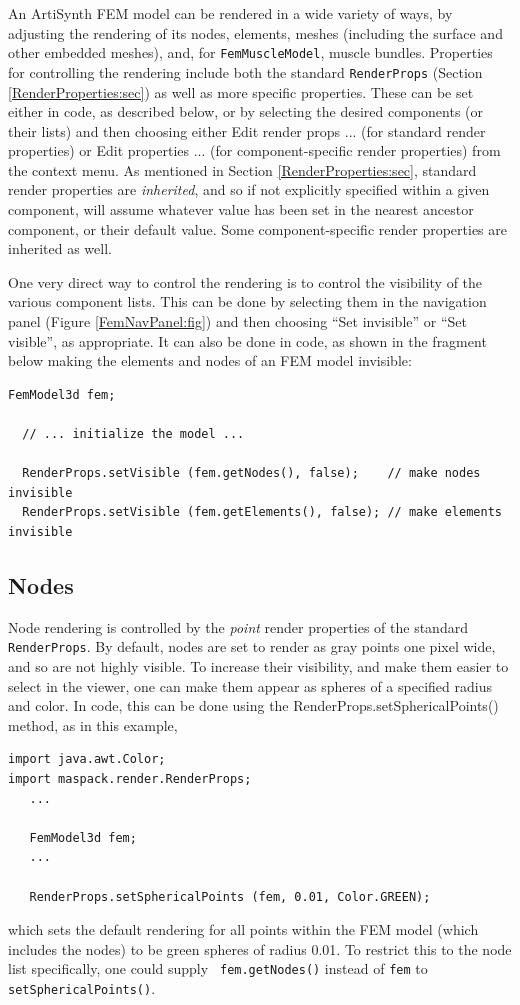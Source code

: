 An ArtiSynth FEM model can be rendered in a wide variety of ways, by
adjusting the rendering of its nodes, elements, meshes (including the
surface and other embedded meshes), and, for {\tt FemMuscleModel},
muscle bundles. Properties for controlling the rendering include both
the standard {\tt RenderProps} (Section \ref{RenderProperties:sec}) as
well as more specific properties. These can be set either in code, as
described below, or by selecting the desired components (or their
lists) and then choosing either {\sf Edit render props ...} (for
standard render properties) or {\sf Edit properties ...} (for
component-specific render properties) from the context menu. As
mentioned in Section \ref{RenderProperties:sec}, standard render
properties are {\it inherited}, and so if not explicitly specified
within a given component, will assume whatever value has been set in
the nearest ancestor component, or their default value.  Some
component-specific render properties are inherited as well.

One very direct way to control the rendering is to control the
visibility of the various component lists. This can be done by
selecting them in the navigation panel (Figure \ref{FemNavPanel:fig})
and then choosing {\sf ``Set invisible''} or {\sf ``Set visible''}, as
appropriate. It can also be done in code, as shown in the fragment
below making the elements and nodes of an FEM model invisible:
%
\begin{lstlisting}[]
  FemModel3d fem;     

  // ... initialize the model ...

  RenderProps.setVisible (fem.getNodes(), false);    // make nodes invisible
  RenderProps.setVisible (fem.getElements(), false); // make elements invisible
\end{lstlisting}
%

\subsection{Nodes}

Node rendering is controlled by the {\it point} render properties of
the standard {\tt RenderProps}. By default, nodes are set to render as
gray points one pixel wide, and so are not highly visible. To increase
their visibility, and make them easier to select in the viewer, one
can make them appear as spheres of a specified radius and color.  In
code, this can be done using the
%
{RenderProps.setSphericalPoints()} method, as in this example,
%
\begin{lstlisting}[]
import java.awt.Color;
import maspack.render.RenderProps;
   ...

   FemModel3d fem;
   ...

   RenderProps.setSphericalPoints (fem, 0.01, Color.GREEN);
\end{lstlisting}
%
which sets the default rendering for all points within the FEM model
(which includes the nodes) to be green spheres of radius 0.01. To restrict
this to the node list specifically, one could supply {\tt
fem.getNodes()} instead of {\tt fem} to {\tt setSphericalPoints()}.

